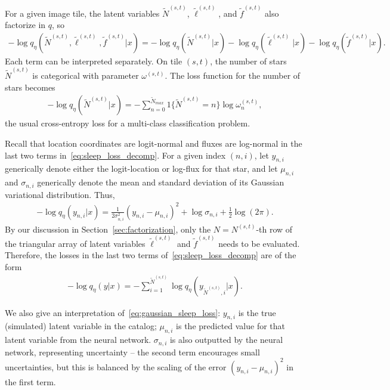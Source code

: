 For a given image tile, the latent variables $\tilde N^{(s,t)}$, $\tilde \ell^{(s,t)}$, and $\tilde f^{(s,t)}$ also factorize in $q$, so 
\begin{align}
- \log q_\eta(\tilde N^{(s,t)}, 
                \tilde \ell^{(s,t)}, \tilde f^{(s,t)} | x) 
=   - \log q_\eta(\tilde N^{(s,t)} | x) 
        - \log q_\eta(\tilde \ell^{(s,t)} | x) 
        - \log q_\eta(\tilde f^{(s,t)} | x). 
        \label{eq:sleep_loss_decomp}
\end{align}
Each term can be interpreted separately. On tile $(s,t)$, the number of stars $\tilde N^{(s,t)}$ is categorical with parameter $\omega^{(s,t)}$. The loss function for the number of stars becomes
\begin{align}
    - \log q_\eta(\tilde N^{(s,t)} | x) = -\sum_{n = 0}^{\tilde N_{max}} 1\{\tilde N^{(s,t)} = n\} \log \omega^{(s,t)}_n, 
    \label{eq:cross_entropy_loss}
\end{align}
the usual cross-entropy loss for a multi-class classification problem. 

Recall that location coordinates are logit-normal and fluxes are log-normal in the last two terms in~\eqref{eq:sleep_loss_decomp}. 
For a given index $(n,i)$, let $y_{n,i}$ generically denote either the 
logit-location or log-flux for that star, 
and let $\mu_{n,i}$ and $\sigma_{n,i}$ generically denote the mean and standard deviation of its Gaussian variational distribution. Thus,
\begin{align}
    -\log q_\eta(y_{n,i} | x) = 
        \frac{1}{2\sigma^2_{n,i}}(y_{n,i} - \mu_{n,i})^2
         + \log\sigma_{n,i}
         + \frac{1}{2}\log(2\pi).
         \label{eq:gaussian_sleep_loss}
\end{align}
By our discussion in Section~\ref{sec:factorization}, 
only the $N = N^{(s,t)}$-th row of the triangular 
array of latent variables $\tilde \ell^{(s,t)}$ and $\tilde f^{(s,t)}$ needs to be evaluated. Therefore, the losses in the last two terms of~\eqref{eq:sleep_loss_decomp} are of the form 
\begin{align}
    -\log q_\eta(y | x) = -\sum_{i = 1}^{\tilde N^{(s,t)}} \log q_\eta(y_{\tilde N^{(s,t)},i} | x). 
\end{align}

We also give an interpretation of~\eqref{eq:gaussian_sleep_loss}: 
$y_{n,i}$ is the true (simulated) latent variable in the catalog; 
$\mu_{n,i}$ is the predicted value for that latent variable from the neural network. 
$\sigma_{n,i}$ is also outputted by the neural network, representing uncertainty -- the second term encourages small uncertainties, but this is 
balanced by the scaling of the error $(y_{n,i} - \mu_{n,i})^2$ in the first term. 

